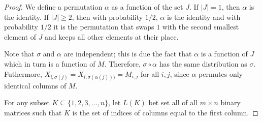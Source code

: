 \documentclass[12pt]{article}
\begin{document}
\begin{proof}
We define a permutation $\alpha$ as a function of the set $J$. If $|J| = 1$,
then $\alpha$ is the identity. If $|J| \ge 2$, then with probability $1/2$,
$\alpha$ is the identity and with probability $1/2$ it is the permutation that
swaps $1$ with the second smallest element of $J$ and keeps all other elements
at their place.

Note that $\sigma$ and $\alpha$ are independent; this is due the fact that
$\alpha$ is a function of $J$ which in turn is a function of $M$. Therefore,
$\sigma \circ \alpha$ has the same distribution as $\sigma$. Futhermore,
$X_{i,\sigma(j)} = X_{i,\sigma(\alpha(j)))} = M_{i,j}$ for all $i,j$, since
$\alpha$ permutes only identical columns of $M$.

For any subset $K \subseteq \{1,2,3,\dots,n\}$, let $L(K)$ bet set all of all $m
\times n$ binary matrices such that $K$ is the set of indices of columns equal
to the first column.


\end{proof}
\end{document}
